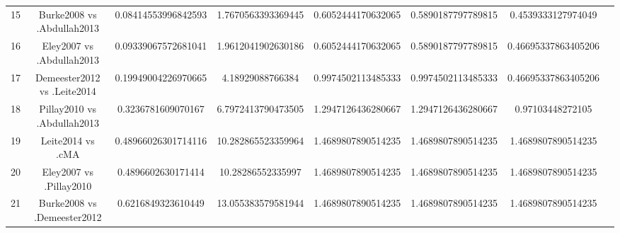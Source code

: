 \documentclass[a4paper,10pt]{article}
\begin{document}
\begin{landscape}
\begin{table}[!htp]
\begin{tabular}{cccccccc}
15&Burke2008 vs .Abdullah2013&0.08414553996842593&1.7670563393369445&0.6052444170632065&0.5890187797789815&0.4539333127974049\\
16&Eley2007 vs .Abdullah2013&0.09339067572681041&1.9612041902630186&0.6052444170632065&0.5890187797789815&0.46695337863405206\\
17&Demeester2012 vs .Leite2014&0.19949004226970665&4.18929088766384&0.9974502113485333&0.9974502113485333&0.46695337863405206\\
18&Pillay2010 vs .Abdullah2013&0.3236781609070167&6.7972413790473505&1.2947126436280667&1.2947126436280667&0.97103448272105\\
19&Leite2014 vs .cMA&0.48966026301714116&10.282865523359964&1.4689807890514235&1.4689807890514235&1.4689807890514235\\
20&Eley2007 vs .Pillay2010&0.4896602630171414&10.28286552335997&1.4689807890514235&1.4689807890514235&1.4689807890514235\\
21&Burke2008 vs .Demeester2012&0.6216849323610449&13.055383579581944&1.4689807890514235&1.4689807890514235&1.4689807890514235\\
\hline
\end{tabular}
\end{table}

\end{landscape}
\end{document}
